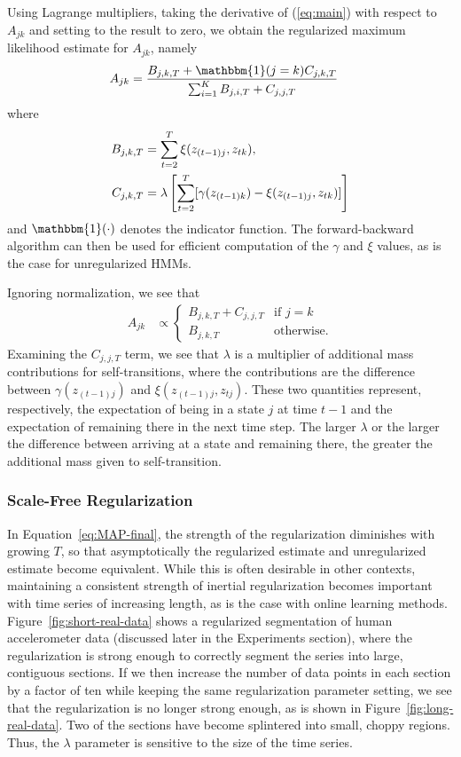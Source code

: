 \documentclass[letterpaper]{article}
\begin{document}
Using Lagrange multipliers, taking the derivative of (\ref{eq:main}) with respect to $A_{jk}$ and setting to the result to zero, we obtain the regularized maximum likelihood estimate for $A_{jk}$, namely
\begin{align}\label{eq:PSO-final}
    A_{jk} &= \frac{B_{j,k,T} + {\mathbbm{1}(j = k)}C_{j,k,T}} 
                   {\sum_{i=1}^{K} B_{j,i,T} + C_{j,j,T}}
\end{align}
where 
\begin{align}\label{eq:PSO-final-C-part}
    B_{j,k,T} &= \sum_{t=2}^{T} \xi(z_{(t-1)j}, z_{tk}), \notag\\
    C_{j,k,T} &= \lambda\left[\sum_{t=2}^{T}[\gamma(z_{(t-1)k}) - \xi(z_{(t-1)j}, z_{tk})]\right] 
\end{align}
and $\mathbbm{1}(\cdot)$ denotes the indicator function. The forward-backward algorithm can then be used for efficient computation of the $\gamma$ and $\xi$ values, as is the case for unregularized HMMs.

Ignoring normalization, we see that
\begin{align*}
    A_{jk} &\propto \begin{cases} 
                B_{j,k,T} + C_{j,j,T} & \mbox{if } j=k \\ 
                B_{j,k,T} & \mbox{otherwise.}
              \end{cases}
\end{align*}
Examining the $C_{j,j,T}$ term, we see that $\lambda$ is a multiplier of additional mass contributions for self-transitions, where the contributions are the difference between $\gamma(z_{(t-1)j})$ and $\xi(z_{(t-1)j}, z_{tj})$. These two quantities represent, respectively, the expectation of being in a state $j$ at time $t-1$ and the expectation of remaining there in the next time step. The larger $\lambda$ or the larger the difference between arriving at a state and remaining there, the greater the additional mass given to self-transition. 

\subsubsection{Scale-Free Regularization}

In Equation~\ref{eq:MAP-final}, the strength of the regularization diminishes with growing $T$, so that asymptotically the regularized estimate and unregularized estimate become equivalent. While this is often desirable in other contexts, maintaining a consistent strength of inertial regularization becomes important with time series of increasing length, as is the case with online learning methods. Figure~\ref{fig:short-real-data} shows a regularized segmentation of human accelerometer data (discussed later in the Experiments section), where the regularization is strong enough to correctly segment the series into large, contiguous sections. If we then increase the number of data points in each section by a factor of ten while keeping the same regularization parameter setting, we see that the regularization is no longer strong enough, as is shown in Figure~\ref{fig:long-real-data}. Two of the sections have become splintered into small, choppy regions. Thus, the $\lambda$ parameter is sensitive to the size of the time series.
\end{document}
